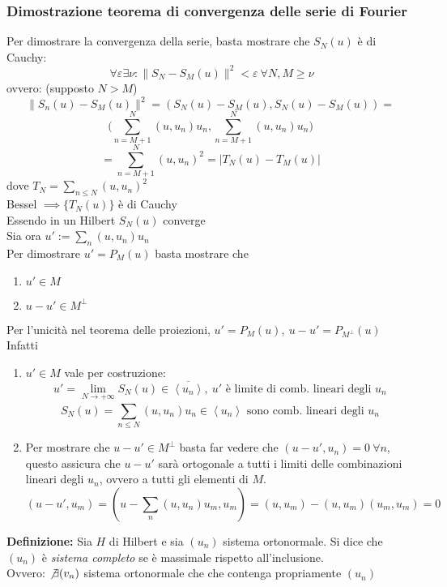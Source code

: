 \subsubsection{Dimostrazione teorema di convergenza delle serie di Fourier}
Per dimostrare la convergenza della serie, basta mostrare che $S_N(u)$ è di Cauchy:
\[\ \forall \varepsilon\exists \nu:\|S_N-S_M(u)\|^2<\varepsilon\ \forall N,M\ge \nu\]
ovvero: (supposto $N>M$)
\[\|S_n(u)-S_M(u)\|^2=(S_N(u)-S_M(u),S_N(u)-S_M(u))=\]
\[\bigg(\sum_{n=M+1}^{N} (u,u_n)u_n,\sum_{n=M+1}^{N} (u,u_n)u_n\bigg)\]
\[=\sum_{n=M+1}^{N} (u,u_n)^2=|T_N(u)-T_M(u)|\]
dove $T_N=\sum_{n\le N}^{} (u,u_n)^2$\\ 
Bessel $\implies \{T_N(u)\} $ è di Cauchy
\\Essendo in un Hilbert $S_N(u)$ converge
\\Sia ora $u':=\sum_{n}^{} (u,u_n)u_n$ 
\\Per dimostrare $u'=P_M(u)$ basta mostrare che
\begin{enumerate}
	\item $u'\in M$ 
	\item $u-u'\in M^\perp$
\end{enumerate}
Per l'unicità nel teorema delle proiezioni, $u'=P_M(u),\ u-u'=P_{M^\perp}(u)$
\\Infatti
\begin{enumerate}
	\item $u'\in M$ vale per costruzione:
		\[u'=\lim_{N \to +\infty} S_N(u)\in \overline{\left< u_n \right> },\ u'\text{ è limite di comb. lineari degli }u_n \] \[ S_N(u)=\sum_{n\le N}^{} (u,u_n)u_n \in \left< u_n \right> \text{ sono comb. lineari degli }u_n\]
	\item Per mostrare che $u-u'\in M^\perp$ basta far vedere che $(u-u',u_n)=0\ \forall n$, questo assicura che $u-u'$ sarà ortogonale a tutti i limiti delle combinazioni lineari degli $u_n$, ovvero a tutti gli elementi di $M$.\[(u-u',u_m)=(u-\sum_{n}^{} (u,u_n)u_m,u_m)=(u,u_m)-(u,u_m)(u_m,u_m)=0\]
\end{enumerate}
\divider
\begin{tcolorbox}
	\textbf{Definizione: }Sia $H$ di Hilbert e sia $(u_n)$ sistema ortonormale. 
	Si dice che $(u_n)$ è \emph{sistema completo} se è massimale rispetto all'inclusione.
	\\Ovvero: $\not\exists (v_n)$ sistema ortonormale che che contenga propriamente $(u_n)$
\end{tcolorbox}
